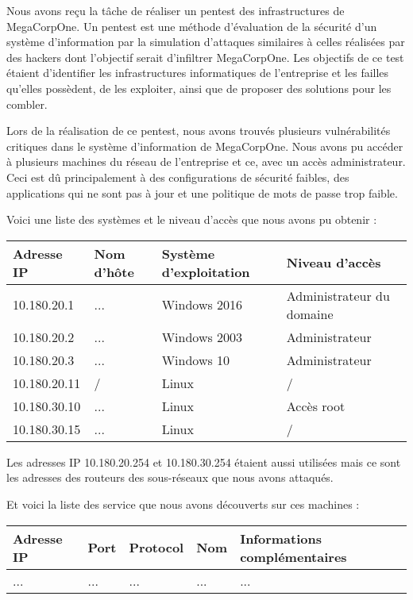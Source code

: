 \documentclass[french,oneside]{article}
\begin{document}
Nous avons reçu la tâche de réaliser un pentest des infrastructures de MegaCorpOne. Un pentest est une méthode d'évaluation de la sécurité d'un système d'information par la simulation d'attaques similaires à celles réalisées par des hackers dont l'objectif serait d'infiltrer MegaCorpOne. Les objectifs de ce test étaient d'identifier les infrastructures informatiques de l'entreprise et les failles qu'elles possèdent, de les exploiter, ainsi que de proposer des solutions pour les combler.

Lors de la réalisation de ce pentest, nous avons trouvés plusieurs vulnérabilités critiques dans le système d'information de MegaCorpOne. Nous avons pu accéder à plusieurs machines du réseau de l'entreprise et ce, avec un accès administrateur. Ceci est dû principalement à des configurations de sécurité faibles, des applications qui ne sont pas à jour et une politique de mots de passe trop faible.

Voici une liste des systèmes et le niveau d'accès que nous avons pu obtenir :

\begin{center} \begin{tabular}{llll}
    Adresse IP    & Nom d'hôte & Système d'exploitation & Niveau d'accès            \\ \hline
    10.180.20.1   & ...        & Windows 2016           & Administrateur du domaine \\
    10.180.20.2   & ...        & Windows 2003           & Administrateur            \\
    10.180.20.3   & ...        & Windows 10             & Administrateur            \\
    10.180.20.11  & /          & Linux                  & /                         \\
    10.180.30.10  & ...        & Linux                  & Accès root                \\
    10.180.30.15  & ...        & Linux                  & /                         \\
\end{tabular} \end{center}
Les adresses IP 10.180.20.254 et 10.180.30.254 étaient aussi utilisées mais ce sont les adresses des routeurs des sous-réseaux que nous avons attaqués.

Et voici la liste des service que nous avons découverts sur ces machines :

\begin{center} \begin{longtable}{llllp{8.5cm}}
    Adresse IP   & Port & Protocol & Nom & Informations complémentaires  \\ \hline
    ...          & ...  & ...      & ... & ...
\end{longtable} \end{center}
\end{document}
